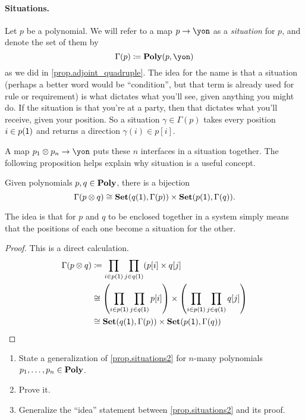 \documentclass[Book-Poly]{subfiles}
\begin{document}
\paragraph{Situations.}

Let $p$ be a polynomial. We will refer to a map $p\to\yon$ as a \emph{situation} for $p$, and denote the set of them by
\[
\Gamma(p)\coloneqq\poly(p,\yon)
\]
as we did in \cref{prop.adjoint_quadruple}. The idea for the name is that a situation (perhaps a better word would be ``condition'', but that term is already used for rule or requirement) is what dictates what you'll see, given anything you might do. If the situation is that you're at a party, then that dictates what you'll receive, given your position. So a situation $\gamma\in\Gamma(p)$ takes every position $i\in p(\textsf{1})$ and returns a direction $\gamma(i)\in p[i]$.

A map $p_1\otimes p_n\to\yon$ puts these $n$ interfaces in a situation together. The following proposition helps explain why situation is a useful concept.

\begin{proposition}\label{prop.situations2}
Given polynomials $p,q\in\textbf{Poly}$, there is a bijection
\[
\Gamma(p\otimes q)\cong\textbf{Set}(q(\textsf{1}),\Gamma(p))\times\textbf{Set}(p(\textsf{1}),\Gamma(q)).
\]
\end{proposition}
The idea is that for $p$ and $q$ to be enclosed together in a system simply means that the positions of each one become a situation for the other. 
\begin{proof}
This is a direct calculation.
\begin{align*}
	\Gamma(p\otimes q)&\coloneqq
	\prod_{i\in p(\textsf{1})}\prod_{j\in q(\textsf{1})}(p[i]\times q[j]\\&\cong
	\left(\prod_{i\in p(\textsf{1})}\prod_{j\in q(\textsf{1})}p[i]\right)\times
		 \left(\prod_{i\in p(\textsf{1})}\prod_{j\in q(\textsf{1})}q[j]\right)\\&\cong
	\textbf{Set}(q(\textsf{1}),\Gamma(p))\times\textbf{Set}(p(\textsf{1}),\Gamma(q))
\end{align*}
\end{proof}

\begin{exercise}
\begin{enumerate}
	\item State a generalization of \cref{prop.situations2} for $n$-many polynomials $p_1,\ldots,p_n\in\textbf{Poly}$.
	\item Prove it.
	\item Generalize the ``idea'' statement between \cref{prop.situations2} and its proof.
\qedhere
\end{enumerate}
\end{exercise}
\end{document}
